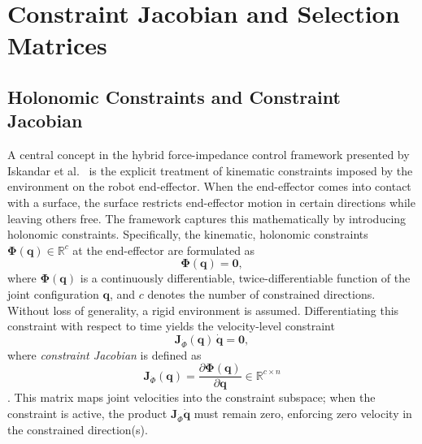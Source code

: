 \documentclass[
	german,%
	accentcolor=9c,%
	ruledheaders=section,%
	class=report,%
	thesis={type=bachelor},%
	fontsize=11pt,%
	parskip=half-,%
	custommargins=true,%
	marginpar=false,%
]{tudapub}
\begin{document}
\section{Constraint Jacobian and Selection Matrices}
\label{sec:constraints_selection}

\subsection{Holonomic Constraints and Constraint Jacobian}
\label{subsec:holonomic_constraints}

A central concept in the hybrid force-impedance control framework presented by
Iskandar et al.~\cite{iskandar2023hybrid} is the explicit treatment of kinematic
constraints imposed by the environment on the robot end-effector.
When the end-effector comes into contact with a surface, the surface restricts
end-effector motion in certain directions while leaving others free.
The framework captures this mathematically by introducing holonomic constraints.
Specifically, the kinematic, holonomic constraints
$\boldsymbol{\Phi}(\mathbf{q}) \in \mathbb{R}^{c}$
at the end-effector are formulated as
%
\begin{equation}
    \boldsymbol{\Phi}(\mathbf{q}) = \mathbf{0},
    \label{eq:holonomic_constraint}
\end{equation}
%
where $\boldsymbol{\Phi}(\mathbf{q})$ is a continuously differentiable,
twice-differentiable function of the joint configuration $\mathbf{q}$, and $c$
denotes the number of constrained directions.
Without loss of generality, a rigid environment is assumed.
Differentiating this constraint with respect to time yields the velocity-level
constraint
%
\begin{equation}
    \mathbf{J}_{\dot{\Phi}}(\mathbf{q})\,\dot{\mathbf{q}} = \mathbf{0},
    \label{eq:velocity_constraint}
\end{equation}
%
where \emph{constraint Jacobian} is defined as
\begin{equation}
\mathbf{J}_{\dot{\Phi}}(\mathbf{q})
  = \dfrac{\partial\boldsymbol{\Phi}(\mathbf{q})}{\partial\mathbf{q}}
  \in \mathbb{R}^{c \times n}
  \label{eq:definition_constraint_jac}
\end{equation}
.
This matrix maps joint velocities into the constraint subspace; when the
constraint is active, the product $\mathbf{J}_{\dot{\Phi}}\dot{\mathbf{q}}$
must remain zero, enforcing zero velocity in the constrained direction(s).
\end{document}
